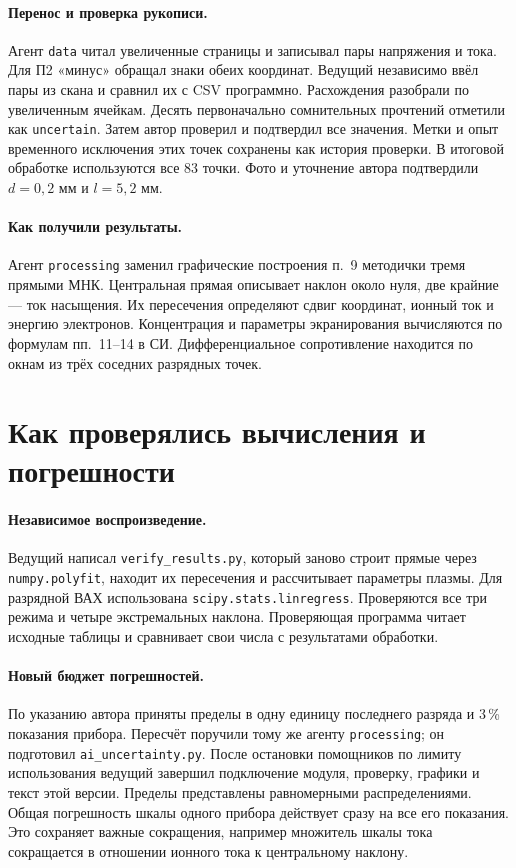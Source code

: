\paragraph{Перенос и проверка рукописи.}
Агент \texttt{data} читал увеличенные страницы и записывал пары напряжения
и тока. Для П2 «минус» обращал знаки обеих координат. Ведущий независимо
ввёл пары из скана и сравнил их с CSV программно. Расхождения разобрали
по увеличенным ячейкам. Десять первоначально сомнительных прочтений
отметили как \texttt{uncertain}. Затем автор проверил и подтвердил все
значения. Метки и опыт временного исключения этих точек сохранены
как история проверки. В итоговой обработке используются все 83 точки.
Фото и уточнение автора подтвердили $d=0{,}2$ мм и $l=5{,}2$ мм.

\paragraph{Как получили результаты.}
Агент \texttt{processing} заменил графические построения п.~9 методички
тремя прямыми МНК. Центральная прямая описывает наклон около нуля,
две крайние --- ток насыщения. Их пересечения определяют сдвиг координат,
ионный ток и энергию электронов. Концентрация и параметры экранирования
вычисляются по формулам пп.~11--14 в СИ. Дифференциальное сопротивление
находится по окнам из трёх соседних разрядных точек.

\clearpage
\section*{Как проверялись вычисления и погрешности}
\paragraph{Независимое воспроизведение.}
Ведущий написал \texttt{verify\_results.py}, который заново строит прямые
через \texttt{numpy.polyfit}, находит их пересечения и рассчитывает параметры
плазмы. Для разрядной ВАХ использована \texttt{scipy.stats.linregress}.
Проверяются все три режима и четыре экстремальных наклона.
Проверяющая программа читает исходные таблицы и сравнивает свои числа
с результатами обработки.

\paragraph{Новый бюджет погрешностей.}
По указанию автора приняты пределы в одну единицу последнего разряда
и 3\,\% показания прибора. Пересчёт поручили тому же агенту
\texttt{processing}; он подготовил \texttt{ai\_uncertainty.py}.
После остановки помощников по лимиту использования ведущий завершил
подключение модуля, проверку, графики и текст этой версии.
Пределы представлены равномерными распределениями. Общая погрешность
шкалы одного прибора действует сразу на все его показания.
Это сохраняет важные сокращения, например множитель шкалы тока
сокращается в отношении ионного тока к центральному наклону.

